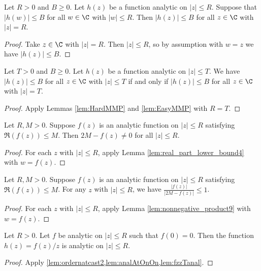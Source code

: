 \begin{lemma} \label{lem:EasyMMP}  \leanok
Let $R>0$ and $B\ge0$. Let $h(z)$ be a function analytic on $|z| \le R$. Suppose that $|h(w)| \le B$ for all $w\in \C$ with $|w|\le R$. Then $|h(z)| \le B$ for all $z\in \C$ with $|z|= R$.
\end{lemma}
\begin{proof} \leanok
Take $z\in\C$ with $|z|= R$. Then $|z|\le R$, so by assumption with $w=z$ we have $|h(z)| \le B$.
\end{proof}

\begin{lemma} \label{lem:MMP}  \leanok
Let $T>0$ and $B\ge0$. Let $h(z)$ be a function analytic on $|z| \le T$. We have $|h(z)| \le B$ for all $z\in \C$ with $|z|\le T$ if and only if $|h(z)| \le B$ for all $z\in \C$ with $|z|= T$.
\end{lemma}
\begin{proof} \leanok
{}
Apply Lemmas \ref{lem:HardMMP} and \ref{lem:EasyMMP} with $R=T$.
\end{proof}


\begin{lemma}\label{lem:denominator_nonzero}  \leanok
Let $R,M>0$. Suppose $f(z)$ is an analytic function on $|z|\le R$ satisfying $\Re(f(z)) \le M$. Then $2M - f(z) \neq 0$ for all $|z|\le R$.
\end{lemma}
\begin{proof} \leanok
{}
For each $z$ with $|z|\le R$, apply Lemma \ref{lem:real_part_lower_bound4} with $w=f(z)$.
\end{proof}


\begin{lemma}\label{lem:f_vs_2M_minus_f}  \leanok
Let $R,M>0$. Suppose $f(z)$ is an analytic function on $|z|\le R$ satisfying $\Re(f(z)) \le M$. For any $z$ with $|z| \le R$, we have $ \frac{|f(z)|}{|2M - f(z)|}\le1$.
\end{lemma}
\begin{proof} \leanok
{}
For each $z$ with $|z|\le R$, apply Lemma \ref{lem:nonnegative_product9} with $w=f(z)$.
\end{proof}


\begin{lemma}\label{lem:removable_singularity}  \leanok
Let $R>0$. Let $f$ be analytic on $|z| \le R$ such that $f(0)=0$. Then the function $h(z) = f(z)/z$ is analytic on $|z| \le R$.
\end{lemma}
\begin{proof} \leanok
{}
Apply \cref{lem:ordernatcast2,lem:analAtOnOn,lem:fzzTanal}.
\end{proof}

